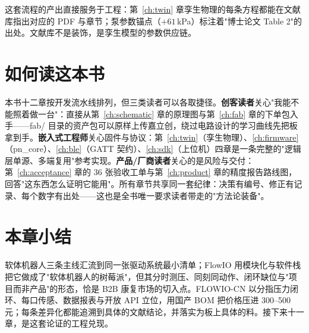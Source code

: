 这套流程的产出直接服务于工程：第~\ref{ch:twin} 章孪生物理的每条方程都能在文献库指出对应的 PDF 与章节；泵参数锚点（$+61$\,kPa）标注着"博士论文 Table 2"的出处。文献库不是装饰，是孪生模型的参数供应链。

\section{如何读这本书}
\label{sec:intro-read}

本书十二章按开发流水线排列，但三类读者可以各取捷径。\textbf{创客读者}关心"我能不能照着做一台"：直接从第~\ref{ch:schematic} 章的原理图与第~\ref{ch:fab} 章的下单包入手——fab/ 目录的资产包可以原样上传嘉立创，绕过电路设计的学习曲线先把板拿到手。\textbf{嵌入式工程师}关心固件与协议：第~\ref{ch:twin}（孪生物理）、\ref{ch:firmware}（pn\_core）、\ref{ch:ble}（GATT 契约）、\ref{ch:sdk}（上位机）四章是一条完整的"逻辑层单源、多端复用"参考实现。\textbf{产品/厂商读者}关心的是风险与交付：第~\ref{ch:acceptance} 章的 36 张验收工单与第~\ref{ch:product} 章的精度报告路线图，回答"这东西怎么证明它能用"。所有章节共享同一套纪律：决策有编号、修正有记录、每个数字有出处——这也是全书唯一要求读者带走的"方法论装备"。

\section*{本章小结}
软体机器人三条主线汇流到同一张驱动系统最小清单；FlowIO 用模块化与软件栈把它做成了"软体机器人的树莓派"，但其分时测压、同刻同动作、闭环缺位与"项目而非产品"的形态，恰是 B2B 康复市场的切入点。FLOWIO-CN 以分指压力闭环、每口传感、数据报表与开放 API 立位，用国产 BOM 把价格压进 300--500 元；每条差异化都能追溯到具体的文献结论，并落实为板上具体的料。接下来十一章，是这套论证的工程兑现。
